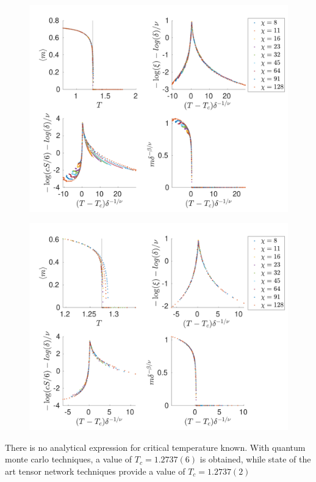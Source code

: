 \begin{figure}
    \center
    \includegraphics[width=\textwidth]{Figuren/phasediag/g25/Full.pdf}
    \caption{  }
    \label{fig:phase:g25:full}
\end{figure}

\begin{figure}
    \center
    \includegraphics[width=\textwidth]{Figuren/phasediag/g25/zoomed.pdf}
    \caption{  }
    \label{fig:phase:g25:zoomed}
\end{figure}

There is no analytical expression for critical temperature known. With quantum monte carlo techniques, a value of $T_c=1.2737(6)$ is obtained, while state of the art tensor network techniques provide a value of $T_c=1.2737(2)$ \cite{Czarnik2019}

